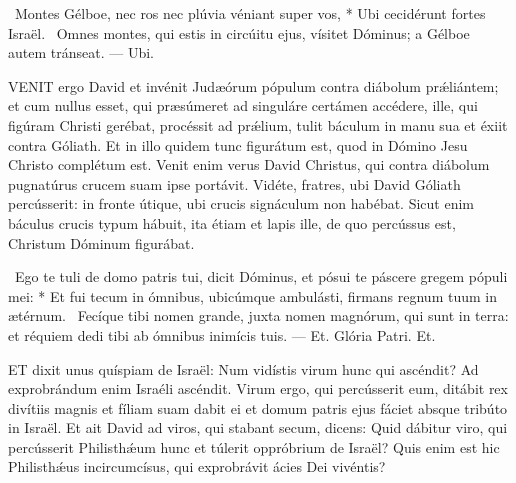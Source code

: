 \R\ Montes Gélboe, nec ros nec plúvia véniant super vos, * Ubi cecidérunt fortes Israël. \V\ Omnes montes, qui estis in circúitu ejus, vísitet Dóminus; a Gélboe autem tránseat. --- Ubi.


\lettrine[lines=2]{V}{ENIT} ergo David et invénit Judæórum pópulum contra diábolum prǽliántem; et cum nullus esset, qui præsúmeret ad singuláre certámen accédere, ille, qui figúram Christi gerébat, procéssit ad prǽlium, tulit báculum in manu sua et éxiit contra Góliath. Et in illo quidem tunc figurátum est, quod in Dómino Jesu Christo complétum est. Venit enim verus David Christus, qui contra diábolum pugnatúrus crucem suam ipse portávit. Vidéte, fratres, ubi David Góliath percússerit: in fronte útique, ubi crucis signáculum non habébat. Sicut enim báculus crucis typum hábuit, ita étiam et lapis ille, de quo percússus est, Christum Dóminum figurábat.

\R\ Ego te tuli de domo patris tui, dicit Dóminus, et pósui te páscere gregem pópuli mei: * Et fui tecum in ómnibus, ubicúmque ambulásti, firmans regnum tuum in ætérnum. \V\ Fecíque tibi nomen grande, juxta nomen magnórum, qui sunt in terra: et réquiem dedi tibi ab ómnibus inimícis tuis. --- Et. Glória Patri. Et.







\lettrine[lines=2]{E}{T} dixit unus quíspiam de Israël: Num vidístis virum hunc qui ascéndit? Ad exprobrándum enim Israéli ascéndit. Virum ergo, qui percússerit eum, ditábit rex divítiis magnis et fíliam suam dabit ei et domum patris ejus fáciet absque tribúto in Israël. Et ait David ad viros, qui stabant secum, dicens: Quid dábitur viro, qui percússerit Philisthǽum hunc et túlerit oppróbrium de Israël? Quis enim est hic Philisthǽus incircumcísus, qui exprobrávit ácies Dei vivéntis?

